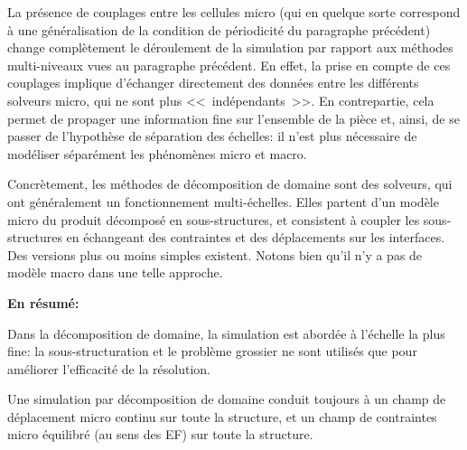 \medskip
La présence de couplages entre les cellules micro
(qui en quelque sorte correspond à une généralisation de la condition de périodicité
du paragraphe précédent) change complètement le déroulement de la simulation par
rapport aux méthodes  multi-niveaux vues au paragraphe précédent.
En effet, la prise en compte de ces couplages implique d'échanger directement des données
entre les différents solveurs micro, qui ne sont plus <<~indépendants~>>.
En contrepartie, cela permet de propager une information fine sur l'ensemble de la pièce et,
ainsi, de se passer de l'hypothèse de séparation des échelles: il n'est plus nécessaire de
modéliser séparément les phénomènes micro et macro.

\medskip
Concrètement, les méthodes de décomposition de domaine
sont des solveurs, qui ont généralement un fonctionnement multi-échelles.
Elles partent d'un modèle micro du produit
décomposé en sous-structures, et consistent à coupler les sous-structures en échangeant des
contraintes et des déplacements sur les interfaces.
Des versions plus ou moins simples existent. Notons bien qu'il n'y a pas de modèle macro
dans une telle approche.

\medskip{}
\textbf{En résumé:}

Dans la décomposition de domaine, la simulation est abordée
à l'échelle la plus fine: la sous-structuration et le problème grossier ne sont utilisés que pour
améliorer l'efficacité de la résolution.

Une simulation par décomposition de domaine conduit toujours
à un champ de déplacement micro continu sur toute la structure, et un champ de contraintes micro
équilibré (au sens des EF) sur toute la structure.

\medskip
{}

